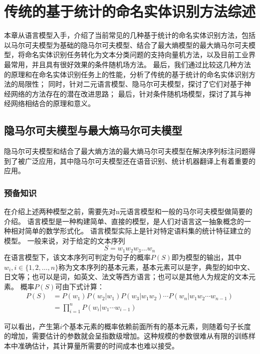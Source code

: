 \chapter{传统的基于统计的命名实体识别方法综述}
本章从语言模型入手，介绍了当前常见的几种基于统计的命名实体识别方法，包括以马尔可夫模型为基础的隐马尔可夫模型、结合了最大熵模型的最大熵马尔可夫模型，将命名实体识别任务转化为文本分类问题的支持向量机方法，以及目前工业界最常用，并且具有很好效果的条件随机场方法。
最后，我们通过比较这几种方法的原理和在命名实体识别任务上的性能，分析了传统的基于统计的命名实体识别方法的局限性；
同时，针对二元语言模型、隐马尔可夫模型，探讨了它们对基于神经网络的方法存在的潜在改进思路；
最后，针对条件随机场模型，探讨了其与神经网络相结合的原理和意义。
\section{隐马尔可夫模型与最大熵马尔可夫模型}
\label{chap:HMM}
隐马尔可夫模型和结合了最大熵方法的最大熵马尔可夫模型在解决序列标注问题得到了被广泛应用，其中隐马尔可夫模型还在语音识别、统计机器翻译上有着重要的应用。
\subsection{预备知识}
在介绍上述两种模型之前，需要先对n元语言模型和一般的马尔可夫模型做简要的介绍。
语言模型是一种构建简单、直接的模型，是人们对语言这一抽象概念的一种相对简单的数学形式化。
语言模型实际上是针对特定语料集的统计特征建立的模型。
一般来说，对于给定的文本序列
\begin{equation}
    S = w_1 w_2 w_3 \dots w_n
\end{equation}
在语言模型下，该文本序列可判定为句子的概率$P(S)$即为模型的输出，其中$w_i, i\in \{1,2,\dots,n\}$称为文本序列的基本元素，基本元素可以是字，典型的如中文、日文等；也可以是词，如英文、法文等西方语言；也可以是其他人为规定的文本元素。
概率$P(S)$可由下式计算：
\begin{align}
    P(S) &= P(w_1)P(w_2 | w_1)P(w_3 | w_1 w_2)\cdots P(w_n | w_1 w_2 \cdots w_{n-1}) \label{eq:n-gram}\\
    &= \prod_{i=1}^{n}P(w_i | w_1 \cdots w_{i-1})
\end{align}

可以看出，产生第$i$个基本元素的概率依赖前面所有的基本元素，则随着句子长度的增加，需要估计的参数就会呈指数级增加。这种规模的参数很难从有限的训练样本中准确估计，其计算量所需要的时间成本也难以接受。

